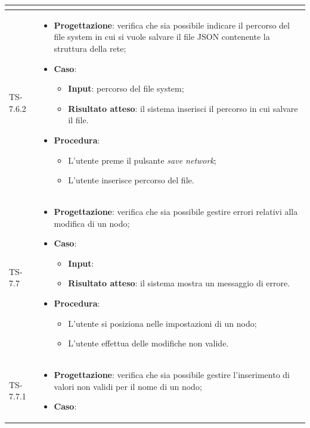 \begin{longtable}{|C{2.5cm}|C{13cm}|}
\begin{itemize}
\end{itemize}
	 \\
	\hline
	{TS-7.6.2} &
\begin{itemize}
	\item \textbf{Progettazione}: verifica che sia possibile indicare il
	percorso del file system in cui si vuole salvare il file JSON contenente la
	struttura della rete;
	\item \textbf{Caso}: 
	\begin{itemize}
		\item \textbf{Input}: percorso del file system;
		\item \textbf{Risultato atteso}: il sistema inserisci il percorso in cui salvare il file.
	\end{itemize}
	\item \textbf{Procedura}:
	\begin{itemize}
		\item L'utente preme il pulsante \emph{save network};
		\item L'utente inserisce percorso del file.
	\end{itemize} 
\end{itemize}
	  \\
	\hline
	{TS-7.7} & 
\begin{itemize}
	\item \textbf{Progettazione}: verifica che sia possibile gestire errori
	relativi alla modifica di un nodo;
	\item \textbf{Caso}: 
	\begin{itemize}
		\item \textbf{Input}: 
		\item \textbf{Risultato atteso}: il sistema mostra un messaggio di errore.
	\end{itemize}
	\item \textbf{Procedura}:
	\begin{itemize}
		\item L'utente si posiziona nelle impostazioni di un nodo;
		\item L'utente effettua delle modifiche non valide.
	\end{itemize} 
\end{itemize}
	 \\
	\hline
	{TS-7.7.1} & 
\begin{itemize}
	\item \textbf{Progettazione}: verifica che sia  possibile gestire
	l'inserimento di valori non validi per il nome di un nodo;
	\item \textbf{Caso}: 

\end{itemize}
\end{longtable}
